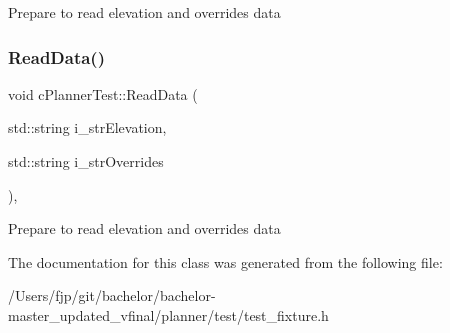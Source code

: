 Prepare to read elevation and overrides data \mbox{\label{classc_planner_test_af8a0f625c6cb4dffc1ea3182332e53c6}} 
\subsubsection{\texorpdfstring{Read\+Data()}{ReadData()}\hspace{0.1cm}{\footnotesize\ttfamily [2/2]}}
{\footnotesize\ttfamily void c\+Planner\+Test\+::\+Read\+Data (\begin{DoxyParamCaption}\item[{std\+::string}]{i\+\_\+str\+Elevation,  }\item[{std\+::string}]{i\+\_\+str\+Overrides }\end{DoxyParamCaption})\hspace{0.3cm}{\ttfamily [inline]}, {\ttfamily [protected]}}

Prepare to read elevation and overrides data 

The documentation for this class was generated from the following file\+:\begin{DoxyCompactItemize}
\item 
/\+Users/fjp/git/bachelor/bachelor-\/master\+\_\+updated\+\_\+vfinal/planner/test/test\+\_\+fixture.\+h\end{DoxyCompactItemize}
